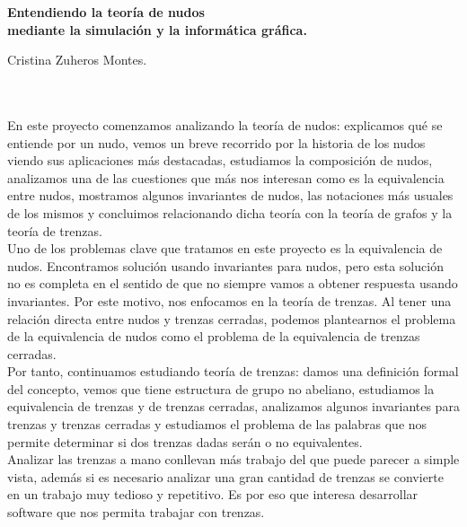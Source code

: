 
\cleardoublepage
\thispagestyle{empty}

\begin{center}
{\large\bfseries Entendiendo la teoría de nudos\\
	 mediante la simulación y la informática gráfica.}\\
\end{center}
\begin{center}
Cristina Zuheros Montes.\\
\end{center}

\\

\vspace{0.7cm}
\\
En este proyecto comenzamos analizando la teoría de nudos: explicamos qué se entiende por un nudo, vemos un breve recorrido por la historia de los nudos viendo sus aplicaciones más destacadas, estudiamos la composición de nudos, analizamos una de las cuestiones que más nos interesan como es la equivalencia entre nudos, mostramos algunos invariantes de nudos, las notaciones más usuales de los mismos y concluimos relacionando dicha teoría con la teoría de grafos y la teoría de trenzas.\\

Uno de los problemas clave que tratamos en este proyecto es la equivalencia de nudos. Encontramos solución usando invariantes para nudos, pero esta solución no es completa en el sentido de que no siempre vamos a obtener respuesta usando invariantes. Por este motivo, nos enfocamos en la teoría de trenzas. Al tener una relación directa entre nudos y trenzas cerradas, podemos plantearnos el problema de la equivalencia de nudos como el problema de la equivalencia de trenzas cerradas.\\ 

Por tanto, continuamos estudiando teoría de trenzas: damos una definición formal del concepto, vemos que tiene estructura de grupo no abeliano, estudiamos la equivalencia de trenzas y de trenzas cerradas, analizamos algunos invariantes para trenzas y trenzas cerradas y estudiamos el problema de las palabras que nos permite determinar si dos trenzas dadas serán o no equivalentes. \\

Analizar las trenzas a mano conllevan más trabajo del que puede parecer a simple vista, además si es necesario analizar una gran cantidad de trenzas se convierte en un trabajo muy tedioso y repetitivo. Es por eso que interesa desarrollar software que nos permita trabajar con trenzas. \\

